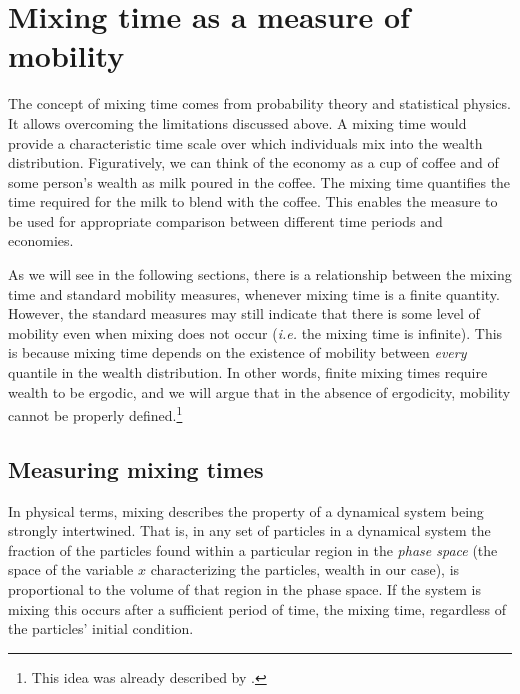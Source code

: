 \documentclass[11pt]{article}
\newcommand{\ie}{{\it i.e.}\xspace}
\numberwithin{equation}{section}
\begin{document}
\FloatBarrier
\section{Mixing time as a measure of mobility}
\label{sec:mixing-time}

The concept of mixing time comes from probability theory and statistical physics. It allows overcoming the limitations discussed above. A mixing time would provide a characteristic time scale over which individuals mix into the wealth distribution. Figuratively, we can think of the economy as a cup of coffee and of some person's wealth as milk poured in the coffee. The mixing time quantifies the time required for the milk to blend with the coffee. This enables the measure to be used for appropriate comparison between different time periods and economies.

As we will see in the following sections, there is a relationship between the mixing time and standard mobility measures, whenever mixing time is a finite quantity. However, the standard measures may still indicate that there is some level of mobility even when mixing does not occur (\ie the mixing time is infinite). This is because mixing time depends on the existence of mobility between \textit{every} quantile in the wealth distribution. In other words, finite mixing times require wealth to be ergodic, and we will argue that in the absence of ergodicity, mobility cannot be properly defined.\footnote{This idea was already described by \citet{Mcfarland1970}.}

\subsection{Measuring mixing times}

In physical terms, mixing describes the property of a dynamical system being strongly intertwined. That is, in any set of particles in a dynamical system the fraction of the particles found within a particular region in the \textit{phase space} (the space of the variable $x$ characterizing the particles, wealth in our case), is proportional to the volume of that region in the phase space. If the system is mixing this occurs after a sufficient period of time, the mixing time, regardless of the particles' initial condition.

\end{document}
